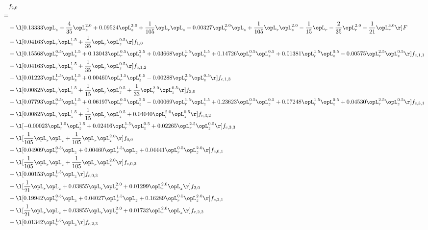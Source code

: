 \begin{alignat}{2} 
\label{eq:f_20_1} 
& f_{2,0} \nonumber \\ 
 = \\ 
& + \l[  0.13333 \opL_z + \frac{4}{35} \opL_z^{2.0} +  0.09524 \opL_z^{3.0} + \frac{1}{105} \opL_r \opL_z   -0.00327 \opL_r^{2.0} \opL_z + \frac{1}{105} \opL_r \opL_z^{2.0} - \frac{1}{15} \opL_r - \frac{2}{35} \opL_r^{2.0} - \frac{1}{21} \opL_r^{3.0}  \r] F \nonumber \\ 
& - \l[  0.04163 \opL_r \opL_z^{1.5} + \frac{1}{35} \opL_r \opL_z^{0.5}  \r] f_{1,0} \nonumber \\ 
& + \l[  0.15568 \opL_r^{0.5} \opL_z^{1.5} +  0.13043 \opL_r^{0.5} \opL_z^{2.5} +  0.03668 \opL_r^{1.5} \opL_z^{1.5} +  0.14726 \opL_r^{0.5} \opL_z^{0.5} +  0.01381 \opL_r^{1.5} \opL_z^{0.5}   -0.00575 \opL_r^{2.5} \opL_z^{0.5}  \r] f_{c,1,1} \nonumber \\ 
& - \l[  0.04163 \opL_r \opL_z^{1.5} + \frac{1}{35} \opL_r \opL_z^{0.5}  \r] f_{c,1,2} \nonumber \\ 
& + \l[  0.01223 \opL_r^{1.5} \opL_z^{1.5} +  0.00460 \opL_r^{1.5} \opL_z^{0.5}   -0.00288 \opL_r^{2.5} \opL_z^{0.5}  \r] f_{c,1,3} \nonumber \\ 
& - \l[  0.00825 \opL_r \opL_z^{1.5} + \frac{1}{15} \opL_r \opL_z^{0.5} + \frac{1}{33} \opL_r^{2.0} \opL_z^{0.5}  \r] f_{3,0} \nonumber \\ 
& + \l[  0.07793 \opL_r^{0.5} \opL_z^{1.5} +  0.06197 \opL_r^{0.5} \opL_z^{2.5}   -0.00069 \opL_r^{1.5} \opL_z^{1.5} +  0.23623 \opL_r^{0.5} \opL_z^{0.5} +  0.07248 \opL_r^{1.5} \opL_z^{0.5} +  0.04530 \opL_r^{2.5} \opL_z^{0.5}  \r] f_{c,3,1} \nonumber \\ 
& - \l[  0.00825 \opL_r \opL_z^{1.5} + \frac{1}{15} \opL_r \opL_z^{0.5} +  0.04040 \opL_r^{2.0} \opL_z^{0.5}  \r] f_{c,3,2} \nonumber \\ 
& + \l[  -0.00023 \opL_r^{1.5} \opL_z^{1.5} +  0.02416 \opL_r^{1.5} \opL_z^{0.5} +  0.02265 \opL_r^{2.5} \opL_z^{0.5}  \r] f_{c,3,3} \nonumber \\ 
& + \l[ \frac{1}{105} \opL_r \opL_z + \frac{1}{105} \opL_r \opL_z^{2.0}  \r] f_{0,0} \nonumber \\ 
& - \l[  0.04909 \opL_r^{0.5} \opL_z +  0.00460 \opL_r^{1.5} \opL_z +  0.04441 \opL_r^{0.5} \opL_z^{2.0}  \r] f_{c,0,1} \nonumber \\ 
& + \l[ \frac{1}{105} \opL_r \opL_z + \frac{1}{105} \opL_r \opL_z^{2.0}  \r] f_{c,0,2} \nonumber \\ 
& - \l[  0.00153 \opL_r^{1.5} \opL_z  \r] f_{c,0,3} \nonumber \\ 
& + \l[ \frac{1}{21} \opL_r \opL_z +  0.03855 \opL_r \opL_z^{2.0} +  0.01299 \opL_r^{2.0} \opL_z  \r] f_{2,0} \nonumber \\ 
& - \l[  0.19942 \opL_r^{0.5} \opL_z +  0.04027 \opL_r^{1.5} \opL_z +  0.16289 \opL_r^{0.5} \opL_z^{2.0}  \r] f_{c,2,1} \nonumber \\ 
& + \l[ \frac{1}{21} \opL_r \opL_z +  0.03855 \opL_r \opL_z^{2.0} +  0.01732 \opL_r^{2.0} \opL_z  \r] f_{c,2,2} \nonumber \\ 
& - \l[  0.01342 \opL_r^{1.5} \opL_z  \r] f_{c,2,3} \nonumber \\ 
\end{alignat} 


